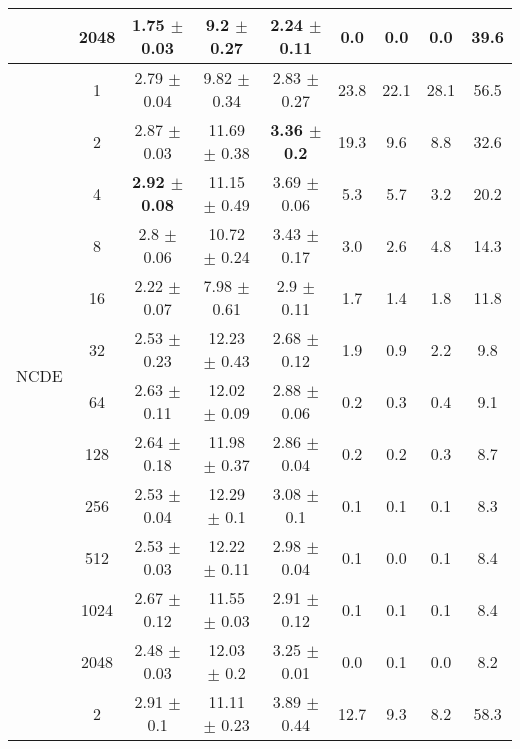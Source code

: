 \documentclass{article}
\begin{document}
\begin{table*}[t]
\begin{center}
\begin{tabular}{ccccccccc}
          & 2048 &  1.75 $\pm$ 0.03 &   9.2 $\pm$ 0.27 &  \textbf{2.24 $\pm$ 0.11} &           0.0 &           0.0 &           0.0 &               39.6 \\
        \midrule
          & 1    &  2.79 $\pm$ 0.04 &   9.82 $\pm$ 0.34 &  2.83 $\pm$ 0.27 &          23.8 &          22.1 &          28.1 &               56.5 \\
          & 2    &  2.87 $\pm$ 0.03 &  11.69 $\pm$ 0.38 &   \textbf{3.36 $\pm$ 0.2} &          19.3 &           9.6 &           8.8 &               32.6 \\
          & 4    &  \textbf{2.92 $\pm$ 0.08} &  11.15 $\pm$ 0.49 &  3.69 $\pm$ 0.06 &           5.3 &           5.7 &           3.2 &               20.2 \\
          & 8    &   2.8 $\pm$ 0.06 &  10.72 $\pm$ 0.24 &  3.43 $\pm$ 0.17 &           3.0 &           2.6 &           4.8 &               14.3 \\
          & 16   &  2.22 $\pm$ 0.07 &   7.98 $\pm$ 0.61 &   2.9 $\pm$ 0.11 &           1.7 &           1.4 &           1.8 &               11.8 \\
        \multirow{2}{*}{NCDE}  & 32   &  2.53 $\pm$ 0.23 &  12.23 $\pm$ 0.43 &  2.68 $\pm$ 0.12 &           1.9 &           0.9 &           2.2 &                9.8 \\
          & 64   &  2.63 $\pm$ 0.11 &  12.02 $\pm$ 0.09 &  2.88 $\pm$ 0.06 &           0.2 &           0.3 &           0.4 &                9.1 \\
          & 128  &  2.64 $\pm$ 0.18 &  11.98 $\pm$ 0.37 &  2.86 $\pm$ 0.04 &           0.2 &           0.2 &           0.3 &                8.7 \\
          & 256  &  2.53 $\pm$ 0.04 &   12.29 $\pm$ 0.1 &   3.08 $\pm$ 0.1 &           0.1 &           0.1 &           0.1 &                8.3 \\
          & 512  &  2.53 $\pm$ 0.03 &  12.22 $\pm$ 0.11 &  2.98 $\pm$ 0.04 &           0.1 &           0.0 &           0.1 &                8.4 \\
          & 1024 &  2.67 $\pm$ 0.12 &  11.55 $\pm$ 0.03 &  2.91 $\pm$ 0.12 &           0.1 &           0.1 &           0.1 &                8.4 \\
          & 2048 &  2.48 $\pm$ 0.03 &   12.03 $\pm$ 0.2 &  3.25 $\pm$ 0.01 &           0.0 &           0.1 &           0.0 &                8.2 \\
        \midrule
          & 2    &   2.91 $\pm$ 0.1 &  11.11 $\pm$ 0.23 &  3.89 $\pm$ 0.44 &          12.7 &           9.3 &           8.2 &               58.3 \\

\end{tabular}
\end{center}
\end{table*}
\end{document}

